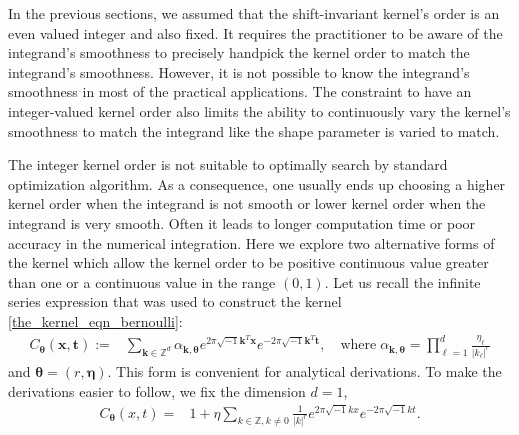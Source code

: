\documentclass{iitthesis}          %
\newcommand{\bm}[1]{\boldsymbol{#1}}
\newcommand{\veta}{{\bm{\eta}}}
\newcommand{\vtheta}{{\bm{\theta}}}
\newcommand{\vk}{\bm{k}}
\newcommand{\vt}{\bm{t}}
\newcommand{\vx}{\bm{x}}
\def\abs#1{\ensuremath{\left \lvert #1 \right \rvert}}
\newcommand{\JRNote}[1]{}
\begin{document}
\label{sec:non_integer_kernel_order}

\JRNote{Need better and more convincing motivation}

In the previous sections, we assumed that the shift-invariant kernel's order is an even valued integer and also fixed. It requires the practitioner to be aware of the integrand's smoothness to precisely handpick the kernel order to match the integrand's smoothness. However, it is not possible to know the integrand's smoothness in most of the practical applications. The constraint to have an integer-valued kernel order also limits the ability to continuously vary the kernel's smoothness to match the integrand like the shape parameter is varied to match. 

The integer kernel order is not suitable to optimally search by standard optimization algorithm.
As a consequence, one usually ends up choosing a higher kernel order when the integrand is not  smooth or lower kernel order when the integrand is very smooth.
Often it leads to longer computation time or poor accuracy in the numerical integration.
Here we explore two alternative forms of the kernel which allow the kernel order to be positive continuous value greater than one or a continuous value in the range $(0,1)$. Let us recall the infinite series expression that was used to construct the kernel \eqref{the_kernel_eqn_bernoulli}:
\begin{align*}
C_\vtheta(\vx, \vt) := &  \sum_{\vk \in \mathbb{Z}^d} \alpha_{\vk,\vtheta}  e^{2 \pi\sqrt{-1} \vk^T\vx}
e^{-2 \pi\sqrt{-1} \vk^T\vt}, \quad \text{where} \; 
\alpha_{\vk,\vtheta} = \prod_{\ell=1}^d \frac{\eta_\ell}{{|k_\ell|}^r} 
\end{align*}
and $\vtheta = (r, \veta)$.  This form is convenient for analytical derivations.
To make the derivations easier to follow, we fix the dimension $d=1$,
\begin{align*}
C_\vtheta(x, t) = & 1 + \eta \sum_{k \in \mathbb{Z}, k \neq 0 } \frac{1}{\abs{k}^r} 
e^{ 2 \pi\sqrt{-1} k x}
e^{-2 \pi\sqrt{-1} k t}.
\end{align*}
\end{document}
